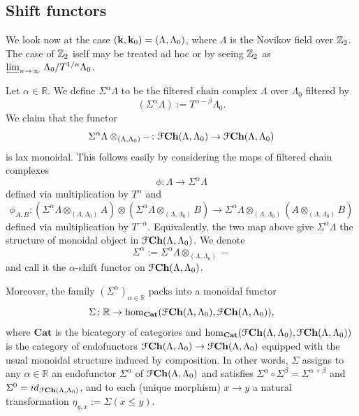 \subsection{Shift functors}
We look now at the case $(\mathbf{k},\mathbf{k}_0)=(\Lambda,\Lambda_0)$, where $\Lambda$ is the Novikov field over $\mathbb{Z}_2$. The case of $\mathbb{Z}_2$ iself may be treated ad hoc or by seeing $\mathbb{Z}_2$ as $\varprojlim_{n \to \infty} \, \Lambda_0 / T^{1/n}\Lambda_0$.

Let $\alpha\in \mathbb{R}$. We define $\Sigma^\alpha\Lambda$ to be the filtered chain complex $\Lambda$ over $\Lambda_0$ filtered by $$(\Sigma^\alpha\Lambda):= T^{\alpha-\beta}\Lambda_0.$$
We claim that the functor $$\Sigma^\alpha\Lambda\otimes_{(\Lambda,\Lambda_0)} -\colon \mathcal{F} \mathbf{Ch}(\Lambda,\Lambda_0)\to \mathcal{F} \mathbf{Ch}(\Lambda,\Lambda_0)$$ is lax monoidal. This follows easily by considering the maps of filtered chain complexes $$\phi\colon \Lambda\to \Sigma^\alpha\Lambda$$ defined via multiplication by $T^\alpha$ and $$\phi_{A,B}\colon (\Sigma^\alpha\Lambda\otimes_{(\Lambda,\Lambda_0)}A)\otimes (\Sigma^\alpha\Lambda \otimes_{(\Lambda,\Lambda_0)}B)\to \Sigma^\alpha\Lambda\otimes_{(\Lambda,\Lambda_0)}(A\otimes_{(\Lambda,\Lambda_0)}B)$$ defined via multiplication by $T^{-\alpha}$. Equivalently, the two map above give $\Sigma^\alpha\Lambda$ the structure of monoidal object in $\mathcal{F} \mathbf{Ch}(\Lambda,\Lambda_0)$. We denote $$\Sigma^\alpha:=\Sigma^\alpha\Lambda\otimes_{(\Lambda,\Lambda_0)}-$$ and call it the $\alpha$-shift functor on $\mathcal{F} \mathbf{Ch}(\Lambda,\Lambda_0)$. 

Moreover, the family $(\Sigma^\alpha)_{\alpha\in \mathbb{R}}$ packs into a monoidal functor $$\Sigma\colon \mathbb{R}\to \hom_{\mathbf{Cat}}(\mathcal{F} \mathbf{Ch}(\Lambda,\Lambda_0),\mathcal{F} \mathbf{Ch}(\Lambda,\Lambda_0)),$$ where $\mathbf{Cat}$ is the bicategory of categories and $\hom_{\mathbf{Cat}}(\mathcal{F} \mathbf{Ch}(\Lambda,\Lambda_0),\mathcal{F} \mathbf{Ch}(\Lambda,\Lambda_0))$ is the category of endofunctors $\mathcal{F} \mathbf{Ch}(\Lambda,\Lambda_0)\to \mathcal{F} \mathbf{Ch}(\Lambda,\Lambda_0)$ equipped with the usual monoidal structure induced by composition. In other words, $\Sigma$ assigns to any $\alpha\in \mathbb{R}$ an endofunctor $\Sigma^\alpha$ of $\mathcal{F} \mathbf{Ch}(\Lambda,\Lambda_0)$ and satisfies $\Sigma^\alpha\circ \Sigma^\beta= \Sigma^{\alpha+\beta}$ and $\Sigma^0=id_{\mathcal{F} \mathbf{Ch}(\Lambda,\Lambda_0)}$, and to each (unique morphism) $x\to y$ a natural transformation $\eta_{y,x}:=\Sigma(x\leq y)$.\\

